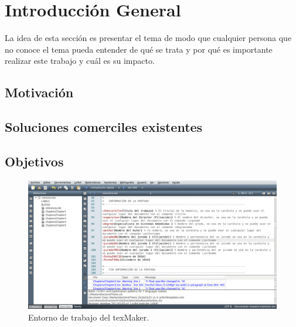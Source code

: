
\chapter{Introducción General} %

\label{Chapter1} %
\label{IntroGeneral}


\newcommand{\keyword}[1]{\textbf{#1}}
\newcommand{\tabhead}[1]{\textbf{#1}}
\newcommand{\code}[1]{\texttt{#1}}
\newcommand{\file}[1]{\texttt{\bfseries#1}}
\newcommand{\option}[1]{\texttt{\itshape#1}}
\newcommand{\grados}{$^{\circ}$}

La idea de esta sección es presentar el tema de modo que cualquier persona que no conoce el tema pueda entender de qué se trata y por qué es importante realizar este trabajo y cuál es su impacto.

\section{Motivación}

\section{Soluciones comerciles existentes}

\section{Objetivos}


\begin{figure}[h]
	\centering
	\includegraphics[width=\textwidth]{./Figures/texmaker.png}
	\caption{Entorno de trabajo del texMaker.}
	\label{fig:texmaker}
\end{figure}








